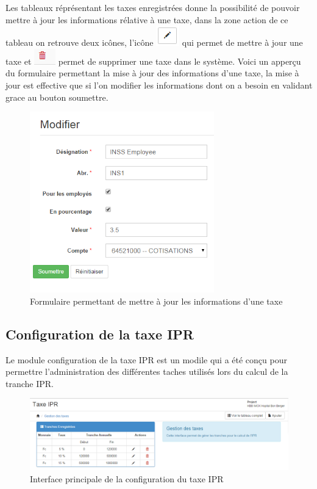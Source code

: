 \documentclass[12pt,a4paper]{report}
\begin{document}
Les tableaux réprésentant les taxes enregistrées donne la possibilité de pouvoir mettre à jour les informations rélative à une taxe, dans la zone action de ce tableau on retrouve deux icônes, l'icône \includegraphics[scale=0.7]{pic/EditBlack.png} qui permet de mettre à jour une taxe et \includegraphics[scale=0.7]{pic/DeleteWRed.png} permet de supprimer une taxe dans le système.
Voici un apperçu du formulaire permettant la mise à jour des informations d'une taxe, la mise à jour est effective que si l'on modifier les informations dont on a besoin en validant grace au bouton soumettre. 

\begin{figure}[h]
\begin{center}
\includegraphics[width=8cm]{pic/ModTaxe.png}
\end{center}
\caption{Formulaire permettant de mettre à jour les informations d'une taxe}
\label{Formulaire permettant de mettre à jour les informations d'une taxe}
\end{figure} 
\newpage
\subsection{Configuration de la taxe IPR}
Le module configuration de la taxe IPR est un modile qui a été conçu pour permettre l'administration des différentes taches utilisés lors du calcul de la tranche IPR. 
\begin{figure}[h]
\begin{center}
\includegraphics[width=14cm]{pic/TaxeIPR.png}
\end{center}
\caption{Interface principale de la configuration du taxe IPR}
\label{Interface principale de la configuration du taxe IPR}
\end{figure}
\end{document}
